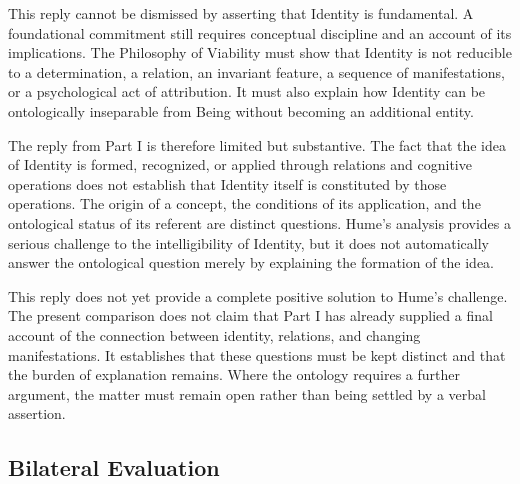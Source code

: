 This reply cannot be dismissed by asserting that
Identity is fundamental. A foundational commitment
still requires conceptual discipline and an account
of its implications. The Philosophy of Viability
must show that Identity is not reducible to a
determination, a relation, an invariant feature,
a sequence of manifestations, or a psychological
act of attribution. It must also explain how
Identity can be ontologically inseparable from
Being without becoming an additional entity.

\label{para:VS.B01.P01.C08.S09.SS12.P003}

The reply from Part I is therefore limited but
substantive. The fact that the idea of Identity
is formed, recognized, or applied through relations
and cognitive operations does not establish that
Identity itself is constituted by those operations.
The origin of a concept, the conditions of its
application, and the ontological status of its
referent are distinct questions. Hume's analysis
provides a serious challenge to the intelligibility
of Identity, but it does not automatically answer
the ontological question merely by explaining
the formation of the idea.

\label{para:VS.B01.P01.C08.S09.SS12.P004}

This reply does not yet provide a complete positive
solution to Hume's challenge. The present comparison
does not claim that Part I has already supplied
a final account of the connection between identity,
relations, and changing manifestations. It establishes
that these questions must be kept distinct and
that the burden of explanation remains. Where
the ontology requires a further argument, the
matter must remain open rather than being settled
by a verbal assertion.



\subsection{Bilateral Evaluation}
\label{subsec:ch08-hume-evaluation}

\label{para:VS.B01.P01.C08.S09.SS13.P001}

